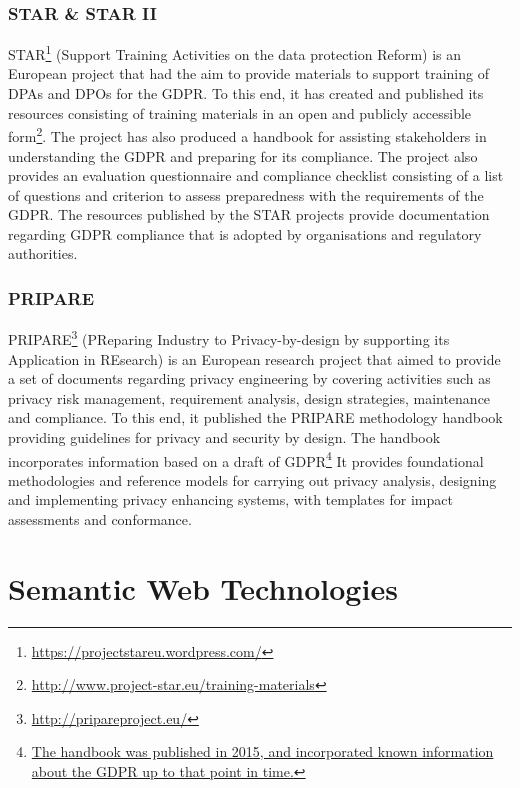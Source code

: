 \subsubsection{STAR \& STAR II}
STAR\footnote{\url{https://projectstareu.wordpress.com/}} (Support Training Activities on the data protection Reform) is an European project that had the aim to provide materials to support training of DPAs and DPOs for the GDPR. To this end, it has created and published its resources consisting of training materials in an open and publicly accessible form\footnote{\url{http://www.project-star.eu/training-materials}}. The project has also produced a handbook for assisting stakeholders in understanding the GDPR and preparing for its compliance. The project also provides an evaluation questionnaire and compliance checklist \cite{noauthor_gdpr_2019-1}consisting of a list of questions and criterion to assess preparedness with the requirements of the GDPR. 
The resources published by the STAR projects provide documentation regarding GDPR compliance that is adopted by organisations and regulatory authorities.

\subsubsection{PRIPARE}
PRIPARE\footnote{\url{http://pripareproject.eu/}} (PReparing Industry to Privacy-by-design by supporting its Application in REsearch) is an European research project that aimed to provide a set of documents regarding privacy engineering by covering activities such as privacy risk management, requirement analysis, design strategies, maintenance and compliance. To this end, it published the PRIPARE methodology handbook \cite{noauthor_pripare-methodology-handbook-final-feb-24-2016.pdf_nodate} providing guidelines for privacy and security by design. The handbook incorporates information based on a draft of GDPR\footnote{\url{The handbook was published in 2015, and incorporated known information about the GDPR up to that point in time.}} It provides foundational methodologies and reference models for carrying out privacy analysis, designing and implementing privacy enhancing systems, with templates for impact assessments and conformance. 

\section{Semantic Web Technologies}\label{sec:background:semweb}

